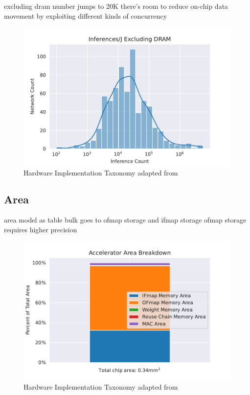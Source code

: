 excluding dram number jumps to 20K
there's room to reduce on-chip data movement by exploiting different kinds of
concurrency

\begin{figure}[ht]
    \centering
    \includegraphics[scale=0.58]{Plots/energy/inferences_wo_dram.pdf}
    \caption{Hardware Implementation Taxonomy adapted from \cite{maestro}}
    \label{fig:hw_taxonomy}
\end{figure}

\subsection{Area}
\label{chap:conv_gemm_equiv:overhead}

area model as table
bulk goes to ofmap storage and ifmap storage
ofmap storage requires higher precision

\begin{figure}[ht]
    \centering
    \includegraphics[scale=0.58]{Plots/resources/area.pdf}
    \caption{Hardware Implementation Taxonomy adapted from \cite{maestro}}
    \label{fig:hw_taxonomy}
\end{figure}

